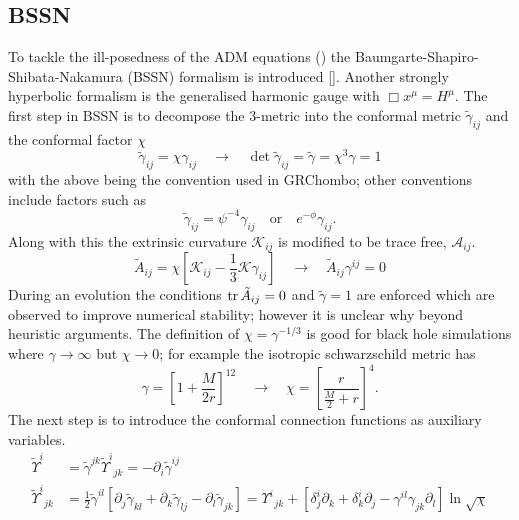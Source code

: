 \documentclass[11pt, oneside]{report}  %
\newcommand{\K}{\mathcal{K}}
\newcommand{\A}{\mathcal{A}}
\numberwithin{equation}{section}
\begin{document}
\subsection{BSSN}
To tackle the ill-posedness of the ADM equations () the Baumgarte-Shapiro-Shibata-Nakamura (BSSN) formalism is introduced []. Another strongly hyperbolic formalism is the generalised harmonic gauge \cite{harmonic} with $ \Box x^\mu = H^\mu$. The first step in BSSN is to decompose the 3-metric into the conformal metric $\tilde{\gamma}_{ij}$ and the conformal factor $\chi$
\begin{equation} \tilde{\gamma}_{ij} = \chi \gamma_{ij}\quad\rightarrow\quad \det{\tilde{\gamma}_{ij}} = \tilde{\gamma} = \chi^3\gamma = 1\end{equation}
with the above being the convention used in GRChombo; other conventions include factors such as
\begin{equation}  \tilde{\gamma}_{ij} = \psi^{-4}\gamma_{ij} \quad \mathrm{or} \quad e^{-\phi}\gamma_{ij}.\end{equation}
 Along with this the extrinsic curvature $\K_{ij}$ is modified to be trace free, $\A_{ij}$.
\begin{equation} \tilde{A}_{ij} = \chi\left[ \K_{ij}-\frac{1}{3}\K\gamma_{ij}\right]\quad\rightarrow \quad\tilde{A}_{ij}\gamma^{ij}=0\end{equation}
During an evolution the conditions $\trace{\tilde{A}_{ij}=0}$  and $\tilde{\gamma}=1$ are enforced which are observed to improve numerical stability; however it is unclear why beyond heuristic arguments. The definition of $\chi = \gamma^{-1/3}$ is good for black hole simulations where $\gamma\rightarrow\infty$ but $\chi \rightarrow 0$; for example the isotropic schwarzschild metric has \begin{equation}\gamma = \left[ 1+ \frac{M}{2r}\right]^{12}\quad \rightarrow \quad \chi =\left[ \frac{r}{\frac{M}{2} + r}\right]^4.\end{equation} 
The next step is to introduce the conformal connection functions as auxiliary variables. 
\begin{align} \tilde{\Upsilon}^i &= \tilde{\gamma}^{jk}\tilde{\Upsilon}^i_{\,\;jk} = -\partial_i \tilde{\gamma}^{ij}\\
 \tilde{\Upsilon}^i_{\,\;jk} &= \frac{1}{2}\tilde{\gamma}^{il}\left[ \partial_j \tilde{\gamma}_{kl} + \partial_k \tilde{\gamma}_{lj} - \partial_l \tilde{\gamma}_{jk}\right] = \Upsilon^i_{\;\,jk} + \left[ \delta^i_j \partial_k + \delta^i_k \partial_j - \gamma^{il}\gamma_{jk}\partial_l\right] \ln \sqrt{\chi}\end{align}
\end{document}

